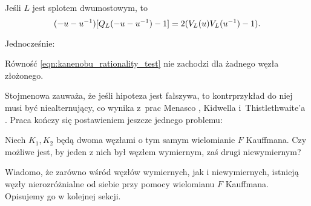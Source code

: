 \begin{proposition}
    Jeśli $L$ jest splotem dwumostowym, to
    \begin{equation}
\label{eqn:kanenobu_rationality_test}%
        (-u-u^{-1}) [Q_L(-u-u^{-1})-1] = 2 (\jones_L(u) \jones_L (u^{-1}) - 1).
    \end{equation}
\end{proposition}

Jednocześnie:

\begin{conjecture}
%
    Równość \ref{eqn:kanenobu_rationality_test} nie zachodzi dla żadnego węzła złożonego.
\end{conjecture}

Stojmenowa \cite[s. 474]{stoimenow2000} zauważa, że jeśli hipoteza jest fałszywa, to kontrprzykład do niej musi być niealternujący, co wynika z~prac Menasco \cite{menasco1984}, Kidwella \cite{kidwell1987} i~Thistlethwaite'a \cite{thistlethwaite1987}.
%
%
%
%
Praca \cite[s. 477]{stoimenow2000} kończy się postawieniem jeszcze jednego problemu:

\begin{conjecture}
    Niech $K_1, K_2$ będą dwoma węzłami o tym samym wielomianie $F$ Kauffmana.
    Czy możliwe jest, by jeden z nich był węzłem wymiernym, zaś drugi niewymiernym?
\end{conjecture}

Wiadomo, że zarówno wśród węzłów wymiernych, jak i niewymiernych, istnieją węzły nierozróżnialne od siebie przy pomocy wielomianu $F$ Kauffmana.
Opisujemy go w kolejnej sekcji.

%


